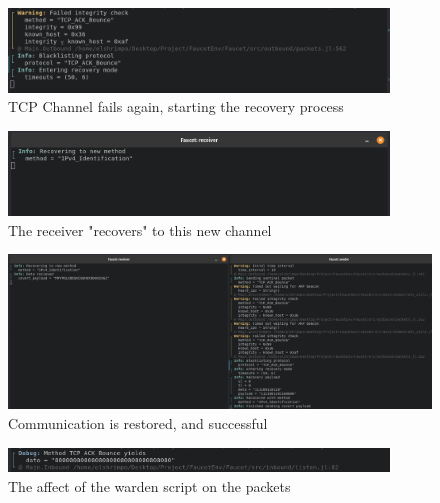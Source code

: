 \begin{figure}[H]
    \centering
    \includegraphics[width=0.9\textwidth]{fig/TCP_Fail_into_rec.png}
    \caption{TCP Channel fails again, starting the recovery process}
    \label{fig:TCP_Failure_again}
\end{figure}

\begin{figure}[H]
    \centering
    \includegraphics[width=0.9\textwidth]{fig/Recv_rec_resp.png}
    \caption{The receiver "recovers" to this new channel}
    \label{fig:recovery}
\end{figure}

\begin{figure}[H]
    \centering
    \includegraphics[width=\textwidth]{fig/Comm_works.png}
    \caption{Communication is restored, and successful}
    \label{fig:successful_comms}
\end{figure}

\begin{figure}[H]
    \centering
    \includegraphics[width=0.9\textwidth]{fig/DEBUG_SHOW_WARDEN.png}
    \caption{The affect of the warden script on the packets}
    \label{fig:warden_affect}
\end{figure}

